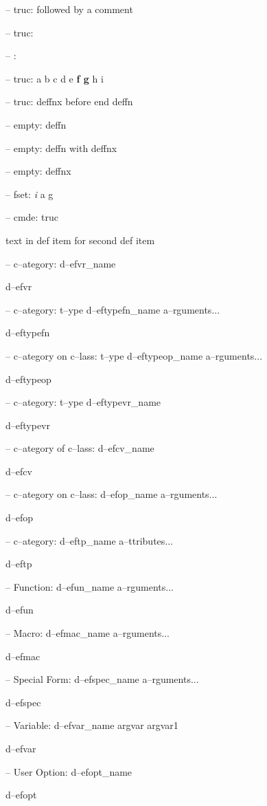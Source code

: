 \documentclass{book}
\begin{document}
\hbox{}-- truc: followed by a comment


\hbox{}-- truc: 


\hbox{}-- : 


\hbox{}-- truc: a b c d e \textbf{f g} h i


\hbox{}-- truc: deffnx before end deffn



\hbox{}-- empty: deffn



\hbox{}-- empty: deffn with deffnx


\hbox{}-- empty: deffnx



\hbox{}-- fset: \emph{i} a g


\hbox{}-- cmde: truc 


text in def item for second def item

\hbox{}-- c--ategory: d--efvr\_name


d--efvr

\hbox{}-- c--ategory: t--ype d--eftypefn\_name a--rguments...


d--eftypefn

\hbox{}-- c--ategory on c--lass: t--ype d--eftypeop\_name a--rguments...


d--eftypeop

\hbox{}-- c--ategory: t--ype d--eftypevr\_name


d--eftypevr

\hbox{}-- c--ategory of c--lass: d--efcv\_name


d--efcv

\hbox{}-- c--ategory on c--lass: d--efop\_name a--rguments...


d--efop

\hbox{}-- c--ategory: d--eftp\_name a--ttributes...


d--eftp

\hbox{}-- Function: d--efun\_name a--rguments...


d--efun

\hbox{}-- Macro: d--efmac\_name a--rguments...


d--efmac

\hbox{}-- Special Form: d--efspec\_name a--rguments...


d--efspec

\hbox{}-- Variable: d--efvar\_name argvar argvar1


d--efvar

\hbox{}-- User Option: d--efopt\_name


d--efopt
\end{document}
